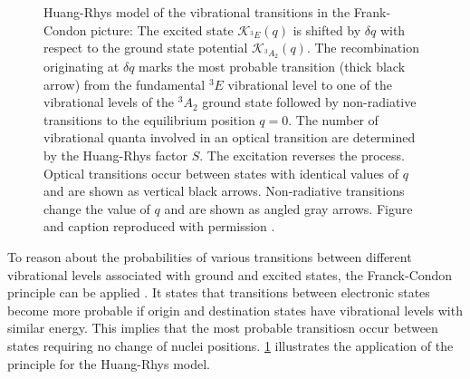    \begin{figure}[htbp]
     \centering
     \caption[Huang-Rhys model of vibrational transitions]{Huang-Rhys model of the vibrational transitions in the Frank-Condon picture: The excited state $\mathcal{K}_{{}^{3}E}(q)$ is shifted by $\delta q$ with respect to the ground state potential $\mathcal{K}_{{}^{3}A_{2}}(q)$. The recombination originating at $\delta q$ marks the most probable transition (thick black arrow) from the fundamental ${}^{3}E$ vibrational level to one of the vibrational levels of the ${}^{3}A_{2}$ ground state followed by non-radiative transitions to the equilibrium position $q = 0$. The number of vibrational quanta involved in an optical transition are determined by the Huang-Rhys factor $S$. The excitation reverses the process. Optical transitions occur between states with identical values of $q$ and are shown as vertical black arrows. Non-radiative transitions change the value of $q$ and are shown as angled gray arrows. Figure and caption reproduced with permission \cite{Riedrich-moller2014}.}
     \label{fig::huang_rhys_model}
   \end{figure}

   To reason about the probabilities of various transitions between different vibrational levels associated with ground and excited states, the Franck-Condon principle can be applied \cite{J.Franck: Elementary processes of photochemical reactions, E. U. Condon: A Theory of Intensity Distribution in Band Systems}. It states that transitions between electronic states become more probable if origin and destination states have vibrational levels with similar energy. This implies that the most probable transitiosn occur between states requiring no change of nuclei positions. \cref{fig::huang_rhys_model} illustrates the application of the principle for the Huang-Rhys model.

